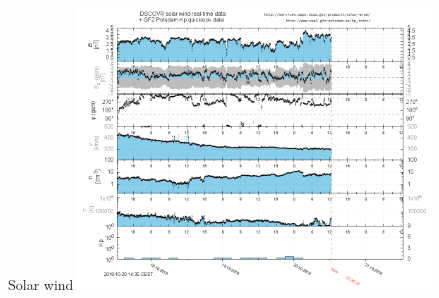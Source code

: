 \begin{frame}[c]{Solar wind}{}
	\includegraphics[width=0.7\textwidth]{../talk_figures/ace_realtime_ap_plot.png}
\end{frame}

